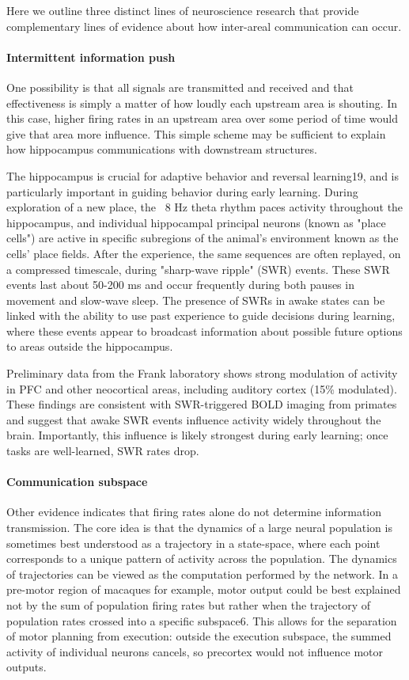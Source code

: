 \documentclass[12pt]{report}
\begin{document}
Here we outline three distinct lines of neuroscience research that provide 
complementary lines of evidence about how inter-areal communication can
occur.

\paragraph*{Intermittent information push}
One possibility is that all signals are transmitted and received and that
effectiveness is simply a matter of how loudly each upstream area is shouting.
In this case, higher firing rates in an upstream area over some period of time
would give that area more influence. This simple scheme may be sufficient to
explain how hippocampus communications with downstream structures. 

The hippocampus is crucial for adaptive behavior and reversal learning19, and is 
particularly important in guiding behavior during early learning. During
exploration of a new place, the ~8 Hz theta rhythm paces activity throughout
the hippocampus, and individual hippocampal principal neurons (known as "place
cells") are active in specific subregions of the animal's environment known as
the cells' place fields. After the experience, the same sequences are often
replayed, on a compressed timescale, during "sharp-wave ripple" (SWR)
events. These SWR events last about 50-200 ms and occur frequently during
both pauses in movement and slow-wave sleep. The presence of SWRs in awake
states can be linked with the ability to use past experience to guide
decisions during learning, where these events appear to broadcast
information about possible future options to areas outside the hippocampus.

Preliminary data from the Frank laboratory shows strong modulation of activity
in PFC and other neocortical areas, including auditory cortex (15\% modulated).
These findings are consistent with SWR-triggered BOLD imaging from primates
and suggest that awake SWR events influence activity widely
throughout the brain. Importantly, this influence is likely strongest during
early learning; once tasks are well-learned, SWR rates drop.

\paragraph*{Communication subspace}
Other evidence indicates that firing rates alone do not determine information 
transmission. The core idea is that the dynamics of a large neural population
is sometimes best understood as a trajectory in a state-space, where each point 
corresponds to a unique pattern of activity across the population. The dynamics
of trajectories can be viewed as the computation performed by the network.
In a pre-motor region of macaques for example, motor output could be best
explained not by the sum of population firing rates but rather when
the trajectory of population rates crossed into a specific subspace6. This
allows for the separation of motor planning from execution: 
outside the execution subspace, the summed activity of individual neurons
cancels, so precortex would not influence motor outputs.
\end{document}
